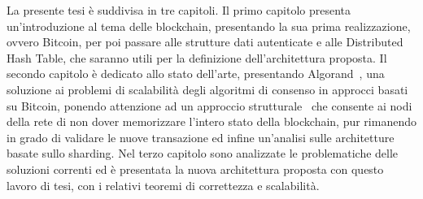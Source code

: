 La presente tesi è suddivisa in tre capitoli. Il primo capitolo presenta un'introduzione al tema delle blockchain, presentando la sua prima realizzazione, ovvero Bitcoin, per poi passare alle strutture dati autenticate e alle Distributed Hash Table, che saranno utili per la definizione dell'architettura proposta. Il secondo capitolo è dedicato allo stato dell'arte, presentando Algorand~\cite{gilad2017algorand}, una soluzione ai problemi di scalabilità degli algoritmi di consenso in approcci basati su Bitcoin, ponendo attenzione ad un approccio strutturale~\cite{bernardini2019blockchains} che consente ai nodi della rete di non dover memorizzare l'intero stato della blockchain, pur rimanendo in grado di validare le nuove transazione ed infine un'analisi sulle architetture basate sullo sharding. Nel terzo capitolo sono analizzate le problematiche delle soluzioni correnti ed è presentata la nuova architettura proposta con questo lavoro di tesi, con i relativi teoremi di correttezza e scalabilità.